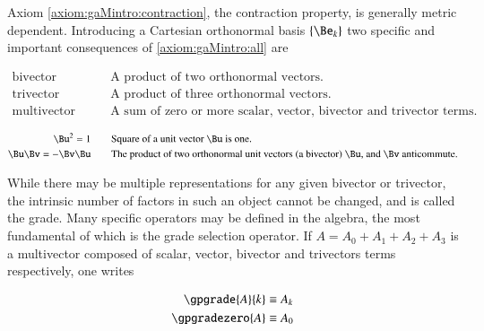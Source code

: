 Axiom \ref{axiom:gaMintro:contraction}, the contraction property, is generally metric dependent.  Introducing a Cartesian orthonormal basis $\{\Be_k\}$ two specific and important consequences of \ref{axiom:gaMintro:all} are

\begin{definition}
\begin{subequations}\label{def:gaMintro:basics}
\begin{align}
\text{bivector} & \qquad \mbox{A product of two orthonormal vectors.} \\
\text{trivector} & \qquad \mbox{A product of three orthonormal vectors.} \\
\text{multivector} & \qquad \mbox{A sum of zero or more scalar, vector, bivector and trivector terms.}
\end{align}
\end{subequations}
\end{definition}

\begin{theorem}
\begin{subequations}\label{thm:gaMintro:basics}
\begin{align}
{\Bu}^2 = 1 & \qquad \mbox{Square of a unit vector $\Bu$ is one.} \\
\Bu \Bv = -\Bv \Bu & \qquad \mbox{The product of two orthonormal unit vectors (a bivector) $\Bu$, and $\Bv$ anticommute.} 
\end{align}
\end{subequations}
\end{theorem}

While there may be multiple representations for any given bivector or trivector, the intrinsic number of factors in such an object cannot be changed, and is called the grade.  Many specific operators may be defined in the algebra, the most fundamental of which is the grade selection operator.  If $A = A_0 + A_1 + A_2 + A_3$ is a multivector composed of scalar, vector, bivector and trivectors terms respectively, one writes

\begin{definition}
\begin{subequations}\label{def:gaMintro:grade}
\begin{align}
\gpgrade{A}{k} &\equiv A_k \\
\gpgradezero{A} &\equiv A_0 \label{def:gaMintro:scalarSelection}
\end{align}
\end{subequations}
\end{definition}

